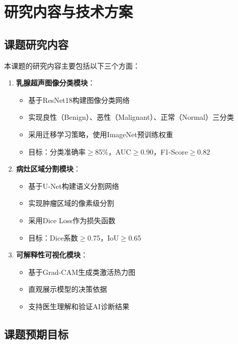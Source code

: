 \documentclass[supercite]{Hust-undergraduate-kaiti}
\theoremstyle{definition}
\begin{document}
\section{研究内容与技术方案}

\subsection{课题研究内容}

本课题的研究内容主要包括以下三个方面：

\begin{enumerate}
    \item \textbf{乳腺超声图像分类模块}：
    \begin{itemize}
        \item 基于ResNet18构建图像分类网络
        \item 实现良性（Benign）、恶性（Malignant）、正常（Normal）三分类
        \item 采用迁移学习策略，使用ImageNet预训练权重
        \item 目标：分类准确率$\geq$85\%，AUC$\geq$0.90，F1-Score$\geq$0.82
    \end{itemize}
    
    \item \textbf{病灶区域分割模块}：
    \begin{itemize}
        \item 基于U-Net构建语义分割网络
        \item 实现肿瘤区域的像素级分割
        \item 采用Dice Loss作为损失函数
        \item 目标：Dice系数$\geq$0.75，IoU$\geq$0.65
    \end{itemize}
    
    \item \textbf{可解释性可视化模块}：
    \begin{itemize}
        \item 基于Grad-CAM生成类激活热力图
        \item 直观展示模型的决策依据
        \item 支持医生理解和验证AI诊断结果
    \end{itemize}
\end{enumerate}

\subsection{课题预期目标}
\end{document}
